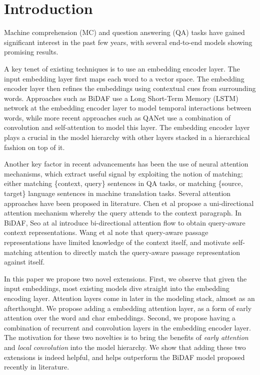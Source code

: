 \section{Introduction}
\label{sec:introduction}

Machine comprehension (MC) and question answering (QA) tasks have gained significant interest in the past few years, with several end-to-end models showing promising results. 

A key tenet of existing techniques is to use an embedding encoder layer. The input embedding layer first maps each word to a vector space. The embedding encoder layer then refines the embeddings using contextual cues from surrounding words. Approaches such as BiDAF \cite{seo2016bidirectional} use a Long Short-Term Memory (LSTM) network at the embedding encoder layer to model temporal interactions between words, while more recent approaches such as QANet \cite{yu2018qanet} use a combination of convolution and self-attention to model this layer. The embedding encoder layer plays a crucial in the model hierarchy with other layers stacked in a hierarchical fashion on top of it. 

Another key factor in recent advancements has been the use of neural attention mechanisms, which extract useful signal by exploiting the notion of matching; either matching \{context, query\} sentences in QA tasks, or matching \{source, target\} language sentences in machine translation tasks. Several attention approaches have been proposed in literature. Chen et al \cite{chen2016thorough} propose a uni-directional attention mechanism whereby the query attends to the context paragraph. In BiDAF, Seo at al \cite{seo2016bidirectional} introduce bi-directional attention flow to obtain query-aware context representations. Wang et al \cite{wang2017gated} note that query-aware passage representations have limited knowledge of the context itself, and motivate self-matching attention to directly match the query-aware passage representation against itself.

In this paper we propose two novel extensions. First, we observe that given the input embeddings, most existing models dive straight into the embedding encoding layer. Attention layers come in later in the modeling stack, almost as an afterthought.  We propose adding a embedding attention layer, as a form of early attention over the word and char embeddings. Second, we propose having a combination of recurrent and convolution layers in the embedding encoder layer. The motivation for these two novelties is to bring the benefits of \textit{early attention} and \textit{local convolution} into the model hierarchy. We show that adding these two extensions is indeed helpful, and helps outperform the BiDAF \cite{seo2016bidirectional} model proposed recently in literature.  

